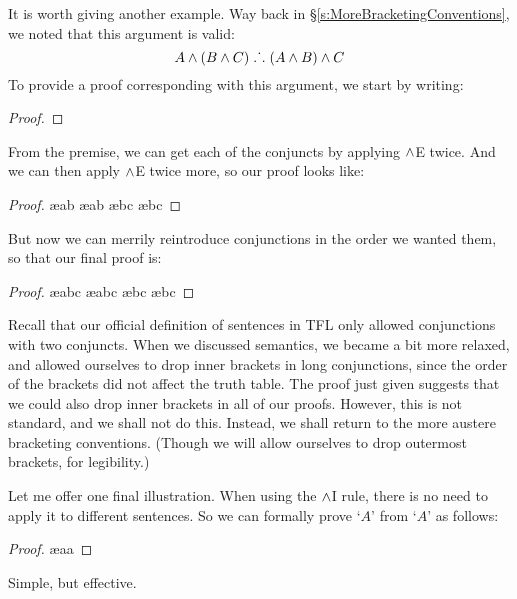 It is worth giving another example. Way back in \S\ref{s:MoreBracketingConventions}, we noted that this argument is valid:
	$$A \wedge (B \wedge C) \mathrel{\ldotp\dot{}\,\ldotp} (A \wedge B) \wedge C$$
To provide a proof corresponding with this argument, we start by writing:
\begin{proof}
\end{proof}
From the premise, we can get each of the conjuncts by applying $\wedge$E twice. And we can then apply $\wedge$E twice more, so our proof looks like:
\begin{proof}
	 \ae{ab}
	 \ae{ab}
	 \ae{bc}
	 \ae{bc}
\end{proof}
But now we can merrily reintroduce conjunctions in the order we wanted them, so that our final proof is:
\begin{proof}
	 \ae{abc}
	 \ae{abc}
	 \ae{bc}
	 \ae{bc}
\end{proof}
Recall that our official definition of sentences in TFL only allowed conjunctions with two conjuncts. When we discussed semantics, we became a bit more relaxed, and allowed ourselves to drop inner brackets in long conjunctions, since the order of the brackets did not affect the truth table. The proof just given suggests that we could also drop inner brackets in all of our proofs. However, this is not standard, and we shall not do this. Instead, we shall return to the more austere bracketing conventions. (Though we will allow ourselves to drop outermost brackets, for legibility.)

Let me offer one final illustration. When using the $\wedge$I rule, there is no need to apply it to different sentences. So we can formally prove `$A$' from `$A$' as follows:
\begin{proof}
	\ae{aa}
\end{proof}
Simple, but effective.

